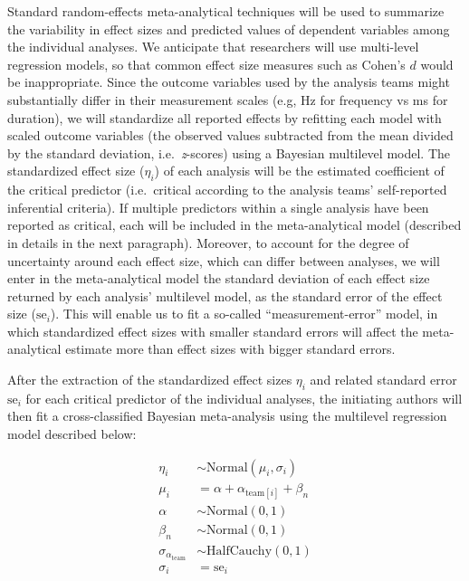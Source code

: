 \documentclass[
  english,
  man,floatsintext]{apa6}
\begin{document}
Standard random-effects meta-analytical techniques will be used to summarize the variability in effect sizes and predicted values of dependent variables among the individual analyses.
We anticipate that researchers will use multi-level regression models, so that common effect size measures such as Cohen's \(d\) would be inappropriate.
Since the outcome variables used by the analysis teams might substantially differ in their measurement scales (e.g, Hz for frequency vs ms for duration), we will standardize all reported effects by refitting each model with scaled outcome variables (the observed values subtracted from the mean divided by the standard deviation, i.e.~\emph{z}-scores) using a Bayesian multilevel model.
The standardized effect size (\(\eta_i\)) of each analysis will be the estimated coefficient of the critical predictor (i.e.~critical according to the analysis teams' self-reported inferential criteria).
If multiple predictors within a single analysis have been reported as critical, each will be included in the meta-analytical model (described in details in the next paragraph).
Moreover, to account for the degree of uncertainty around each effect size, which can differ between analyses, we will enter in the meta-analytical model the standard deviation of each effect size returned by each analysis' multilevel model, as the standard error of the effect size (\(\text{se}_i\)).
This will enable us to fit a so-called \enquote{measurement-error} model, in which standardized effect sizes with smaller standard errors will affect the meta-analytical estimate more than effect sizes with bigger standard errors.

After the extraction of the standardized effect sizes \(\eta_i\) and related standard error \(\text{se}_i\) for each critical predictor of the individual analyses, the initiating authors will then fit a cross-classified Bayesian meta-analysis using the multilevel regression model described below:

\[
\begin{aligned}
\eta_i   & \sim \text{Normal}(\mu_i, \sigma_i) \\
\mu_i     & = \alpha + \alpha_{\text{team}[i]} + \beta_n\\
\alpha  & \sim \text{Normal}(0, 1) \\
\beta_n & \sim \text{Normal}(0, 1) \\
\sigma_{\alpha_{\text{team}}} & \sim \text{HalfCauchy}(0, 1) \\
\sigma_i  & = \text{se}_i
\end{aligned}
\]
\end{document}
